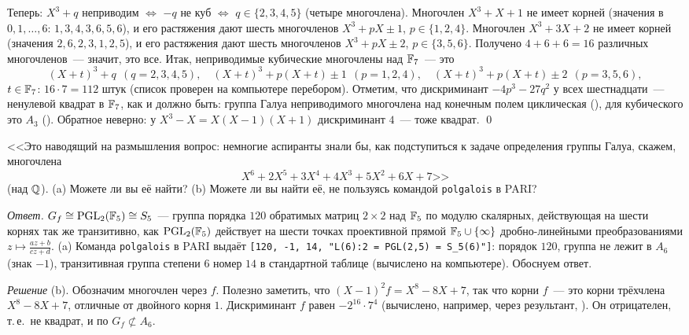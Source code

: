 Теперь: $X^3+q$ неприводим $\iff$ $-q$ не куб $\iff$ $q\in\{2,3,4,5\}$ (четыре многочлена). Многочлен $X^3+X+1$ не имеет корней
(значения в $0,1,\dots,6$: $1,3,4,3,6,5,6$), и его растяжения дают шесть многочленов $X^3+pX\pm1$, $p\in\{1,2,4\}$. Многочлен
$X^3+3X+2$ не имеет корней (значения $2,6,2,3,1,2,5$), и его растяжения дают шесть многочленов $X^3+pX\pm2$, $p\in\{3,5,6\}$.
Получено $4+6+6=16$ различных многочленов~--- значит, это все. Итак, неприводимые кубические многочлены над $\mathbb F_7$~--- это
\[
(X+t)^3+q\ \ (q=2,3,4,5),\quad (X+t)^3+p(X+t)\pm1\ \ (p=1,2,4),\quad (X+t)^3+p(X+t)\pm2\ \ (p=3,5,6),
\]
$t\in\mathbb F_7$: $16\cdot7=112$ штук (список проверен на компьютере перебором). Отметим, что дискриминант
$-4p^3-27q^2$ у всех шестнадцати~--- ненулевой квадрат в $\mathbb F_7$, как и должно быть: группа Галуа неприводимого многочлена над
конечным полем циклическая (), для кубического это $A_3$ (). Обратное неверно: у $X^3-X=X(X-1)(X+1)$ дискриминант
$4$~--- тоже квадрат. \qed

\begin{exercise}[4-6]
<<Это наводящий на размышления вопрос: немногие аспиранты знали бы, как подступиться к задаче определения группы Галуа,
скажем, многочлена
\[
X^6+2X^5+3X^4+4X^3+5X^2+6X+7\text{>>}
\]
\textup(над $\mathbb Q$\textup). (a) Можете ли вы её найти? (b) Можете ли вы найти её, не пользуясь командой \texttt{polgalois}
в PARI?
\end{exercise}

\noindent\emph{Ответ.} $G_f\cong\mathrm{PGL}_2(\mathbb F_5)\cong S_5$~--- группа порядка $120$ обратимых матриц $2\times2$ над $\mathbb F_5$
по модулю скалярных, действующая на шести корнях так же транзитивно, как $\mathrm{PGL}_2(\mathbb F_5)$ действует на шести точках
проективной прямой $\mathbb F_5\cup\{\infty\}$ дробно-линейными преобразованиями $z\mapsto\frac{az+b}{cz+d}$. (a) Команда
\texttt{polgalois} в PARI выдаёт \texttt{[120, -1, 14, "L(6):2 = PGL(2,5) = S\_5(6)"]}: порядок $120$, группа не лежит
в $A_6$ (знак $-1$), транзитивная группа степени $6$ номер $14$ в стандартной таблице (вычислено на компьютере). Обоснуем ответ.

\medskip\noindent\emph{Решение} (b). Обозначим многочлен через $f$. Полезно заметить, что $(X-1)^2f=X^8-8X+7$, так что
корни $f$~--- это корни трёхчлена $X^8-8X+7$, отличные от двойного корня $1$. Дискриминант $f$ равен $-2^{16}\cdot7^4$
(вычислено, например, через результант, ). Он отрицателен, т.\,е.\ не квадрат, и по  $G_f\not\subset A_6$.

